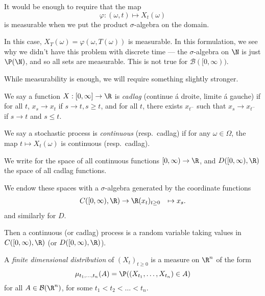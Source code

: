 \documentclass[a4paper]{article}
\begin{document}
It would be enough to require that the map
\[
  \varphi: (\omega, t) \mapsto X_t(\omega)
\]
is measurable when we put the product $\sigma$-algebra on the domain.

In this case, $X_T(\omega) = \varphi(\omega, T(\omega))$ is measurable. In this formulation, we see why we didn't have this problem with discrete time --- the $\sigma$-algebra on $\N$ is just $\P(\N)$, and so all sets are measurable. This is not true for $\mathcal{B}([0, \infty))$.

While measurability is enough, we will require something slightly stronger.

\begin{defi}
  We say a function $X: [0, \infty] \to \R$ is \emph{cadlag} (continue \'a droite, limite \'a gauche) if for all $t$, $x_s \to x_t$ if $s \to t, s \geq t$, and for all $t$, there exists $x_{t^-}$ such that $x_s \to x_{t^-}$ if $s \to t$ and $s \leq t$.
\end{defi}

\begin{defi}
  We say a stochastic process is \emph{continuous} (resp.\ cadlag) if for any $\omega \in \Omega$, the map $t \mapsto X_t (\omega)$ is continuous (resp.\ cadlag). %
\end{defi}

\begin{notation}
  We write \term{$C([0, \infty), \R)$} for the space of all continuous functions $[0, \infty) \to \R$, and $D([0, \infty), \R)$ the space of all cadlag functions.

  We endow these spaces with a $\sigma$-algebra generated by the coordinate functions
  \begin{align*}
    C([0, \infty), \R) &\to \R
    (x_t)_{t \geq 0} &\mapsto x_s.
  \end{align*}
  and similarly for $D$.
\end{notation}

Then a continuous (or cadlag) process is a random variable taking values in $C([0, \infty), \R)$ (or $D([0, \infty), \R)$).

\begin{defi}
  A \emph{finite dimensional distribution} of $(X_t)_{t \geq 0}$ is a measure on $\R^n$ of the form
  \[
    \mu_{t_1, \ldots, t_n}(A) = \P((X_{t_1}, \ldots, X_{t_n}) \in A)
  \]
  for all $A \in \mathcal{B}(\R^n)$, for some $t_1 < t_2 < \ldots < t_n$.
\end{defi}
\end{document}
